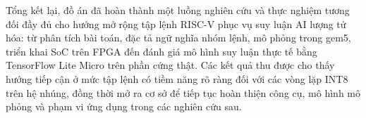 \documentclass[../DoAn.tex]{subfiles}
\begin{document}
Tổng kết lại, đồ án đã hoàn thành một luồng nghiên cứu và thực nghiệm tương
đối đầy đủ cho hướng mở rộng tập lệnh RISC-V phục vụ suy luận AI lượng tử hóa:
từ phân tích bài toán, đặc tả ngữ nghĩa nhóm lệnh, mô phỏng trong gem5, triển
khai SoC trên FPGA đến đánh giá mô hình suy luận thực tế bằng TensorFlow Lite Micro
trên phần cứng thật. Các kết quả thu được cho thấy hướng tiếp cận ở mức tập
lệnh có tiềm năng rõ ràng đối với các vòng lặp INT8 trên hệ nhúng, đồng thời
mở ra cơ sở để tiếp tục hoàn thiện công cụ, mô hình mô phỏng và phạm vi ứng
dụng trong các nghiên cứu sau.
\end{document}

